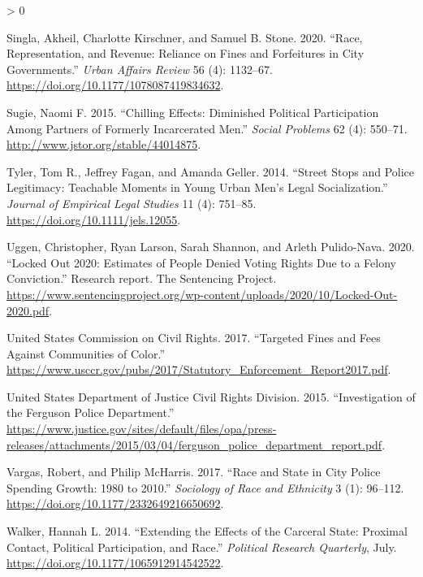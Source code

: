\documentclass[
  12pt,
]{article}
\newlength{\cslhangindent}
\newenvironment{CSLReferences}[2] %
 {%
  \setlength{\parindent}{0pt}
  \ifodd #1 \everypar{\setlength{\hangindent}{\cslhangindent}}\ignorespaces\fi
  \ifnum #2 > 0
  \setlength{\parskip}{#2\baselineskip}
  \fi
 }%
 {}
\begin{document}
\begin{CSLReferences}{1}{0}
\leavevmode\hypertarget{ref-Singla2020}{}%
Singla, Akheil, Charlotte Kirschner, and Samuel B. Stone. 2020. {``Race, {Representation}, and {Revenue}: {Reliance} on {Fines} and {Forfeitures} in {City Governments}.''} \emph{Urban Affairs Review} 56 (4): 1132--67. \url{https://doi.org/10.1177/1078087419834632}.

\leavevmode\hypertarget{ref-Sugie2015}{}%
Sugie, Naomi F. 2015. {``Chilling {Effects}: {Diminished Political Participation} Among {Partners} of {Formerly Incarcerated Men}.''} \emph{Social Problems} 62 (4): 550--71. \url{http://www.jstor.org/stable/44014875}.

\leavevmode\hypertarget{ref-Tyler2014}{}%
Tyler, Tom R., Jeffrey Fagan, and Amanda Geller. 2014. {``Street {Stops} and {Police Legitimacy}: {Teachable Moments} in {Young Urban Men}'s {Legal Socialization}.''} \emph{Journal of Empirical Legal Studies} 11 (4): 751--85. \url{https://doi.org/10.1111/jels.12055}.

\leavevmode\hypertarget{ref-Uggen2020}{}%
Uggen, Christopher, Ryan Larson, Sarah Shannon, and Arleth Pulido-Nava. 2020. {``Locked {Out} 2020: {Estimates} of {People Denied Voting Rights Due} to a {Felony Conviction}.''} Research report. {The Sentencing Project}. \url{https://www.sentencingproject.org/wp-content/uploads/2020/10/Locked-Out-2020.pdf}.

\leavevmode\hypertarget{ref-UnitedStatesCommissiononCivilRights2017}{}%
United States Commission on Civil Rights. 2017. {``Targeted {Fines} and {Fees Against Communities} of {Color}.''} \url{https://www.usccr.gov/pubs/2017/Statutory_Enforcement_Report2017.pdf}.

\leavevmode\hypertarget{ref-UnitedStatesDepartmentofJusticeCivilRightsDivision2015}{}%
United States Department of Justice Civil Rights Division. 2015. {``Investigation of the {Ferguson Police Department}.''} \url{https://www.justice.gov/sites/default/files/opa/press-releases/attachments/2015/03/04/ferguson_police_department_report.pdf}.

\leavevmode\hypertarget{ref-Vargas2017a}{}%
Vargas, Robert, and Philip McHarris. 2017. {``Race and {State} in {City Police Spending Growth}: 1980 to 2010.''} \emph{Sociology of Race and Ethnicity} 3 (1): 96--112. \url{https://doi.org/10.1177/2332649216650692}.

\leavevmode\hypertarget{ref-Walker2014}{}%
Walker, Hannah L. 2014. {``Extending the {Effects} of the {Carceral State}: {Proximal Contact}, {Political Participation}, and {Race}.''} \emph{Political Research Quarterly}, July. \url{https://doi.org/10.1177/1065912914542522}.


\end{CSLReferences}
\end{document}
